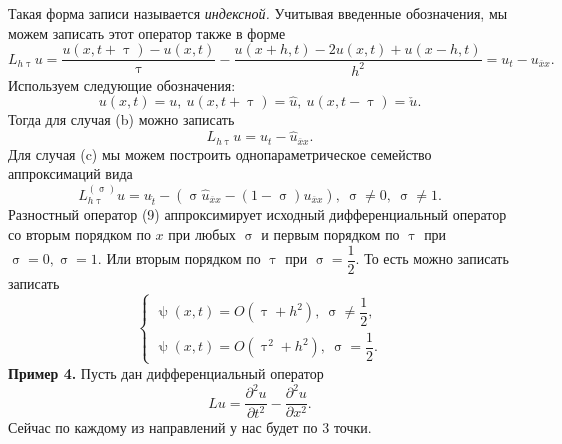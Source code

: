 \documentclass[a4paper, 12pt]{report}
\numberwithin{equation}{section}
\newcommand{\ol}{\overline}
\renewcommand{\tau}{\uptau}
\renewcommand{\sigma}{\upsigma}
\renewcommand{\psi}{\uppsi}
\renewcommand{\d}{\partial}
\begin{document}
Такая форма записи называется \textit{индексной.}
Учитывая введенные обозначения, мы можем записать этот оператор также в форме 
\begin{equation}
	L_{h\tau} u = \dfrac{u(x, t+\tau) - u(x,t)}{\tau} - \dfrac{u(x+h, t) - 2u(x,t) + u(x-h, t)}{h^2} = u_t - u_{\ol x x}.
\end{equation}
Используем следующие обозначения: $$u(x,t) = u,\ u(x, t+\tau) = \hat u, \ u(x, t-\tau) = \check {u}.$$
Тогда для случая (b) можно записать \begin{equation}
	L_{h\tau} u = u_t - \hat u_{\ol x x}.
\end{equation}
Для случая (c) мы можем построить однопараметрическое семейство аппроксимаций вида
\begin{equation}
	L_{h\tau}^{(\sigma)}u = u_{\hat t} - (\sigma \hat u_{\ol x x} - (1-\sigma) u_{\ol x x}),\ \sigma \ne 0,\ \sigma \ne 1.
\end{equation}
Разностный оператор (9) аппроксимирует исходный дифференциальный оператор со вторым порядком по $x$ при любых $\sigma$ и первым порядком по $\tau$ при $\sigma =0, \sigma = 1$. Или вторым порядком по $\tau$ при $\sigma = \dfrac 12$. То есть можно записать записать 
\begin{equation}
	\begin{cases}
		\psi(x,t) = O(\tau + h^2),\ \sigma \ne \dfrac 12,\\
		\psi(x,t) = O(\tau^2 + h^2),\ \sigma = \dfrac 12.
	\end{cases}
\end{equation}
\textbf{Пример 4.} Пусть дан дифференциальный оператор $$Lu = \dfrac{\d ^2u}{\d t^2} - \dfrac{\d ^2 u}{\d x^2}.$$
Сейчас по каждому из направлений у нас будет по 3 точки.
\end{document}
